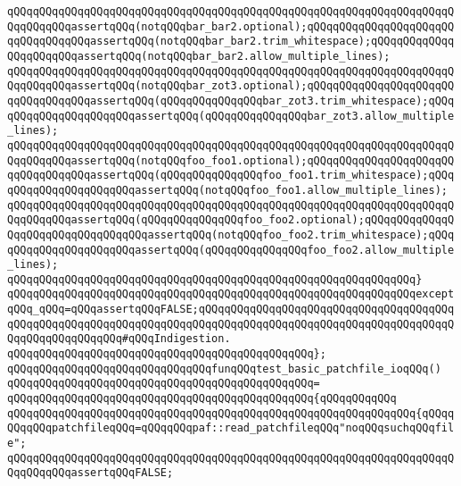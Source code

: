 \verb|qQQqqQQqqQQqqQQqqQQqqQQqqQQqqQQqqQQqqQQqqQQqqQQqqQQqqQQqqQQqqQQqqQQqqQQqqQQqqQQqassertqQQq(notqQQqbar_bar2.optional);qQQqqQQqqQQqqQQqqQQqqQQqqQQqqQQqqQQqassertqQQq(notqQQqbar_bar2.trim_whitespace);qQQqqQQqqQQqqQQqqQQqqQQqassertqQQq(notqQQqbar_bar2.allow_multiple_lines);|\newline
\verb|qQQqqQQqqQQqqQQqqQQqqQQqqQQqqQQqqQQqqQQqqQQqqQQqqQQqqQQqqQQqqQQqqQQqqQQqqQQqqQQqassertqQQq(notqQQqbar_zot3.optional);qQQqqQQqqQQqqQQqqQQqqQQqqQQqqQQqqQQqassertqQQq(qQQqqQQqqQQqqQQqbar_zot3.trim_whitespace);qQQqqQQqqQQqqQQqqQQqqQQqassertqQQq(qQQqqQQqqQQqqQQqbar_zot3.allow_multiple_lines);|\newline
\newline
\verb|qQQqqQQqqQQqqQQqqQQqqQQqqQQqqQQqqQQqqQQqqQQqqQQqqQQqqQQqqQQqqQQqqQQqqQQqqQQqqQQqassertqQQq(notqQQqfoo_foo1.optional);qQQqqQQqqQQqqQQqqQQqqQQqqQQqqQQqqQQqassertqQQq(qQQqqQQqqQQqqQQqfoo_foo1.trim_whitespace);qQQqqQQqqQQqqQQqqQQqqQQqassertqQQq(notqQQqfoo_foo1.allow_multiple_lines);|\newline
\verb|qQQqqQQqqQQqqQQqqQQqqQQqqQQqqQQqqQQqqQQqqQQqqQQqqQQqqQQqqQQqqQQqqQQqqQQqqQQqqQQqassertqQQq(qQQqqQQqqQQqqQQqfoo_foo2.optional);qQQqqQQqqQQqqQQqqQQqqQQqqQQqqQQqqQQqassertqQQq(notqQQqfoo_foo2.trim_whitespace);qQQqqQQqqQQqqQQqqQQqqQQqassertqQQq(qQQqqQQqqQQqqQQqfoo_foo2.allow_multiple_lines);|\newline
\verb|qQQqqQQqqQQqqQQqqQQqqQQqqQQqqQQqqQQqqQQqqQQqqQQqqQQqqQQqqQQqqQQq}|\newline
\verb|qQQqqQQqqQQqqQQqqQQqqQQqqQQqqQQqqQQqqQQqqQQqqQQqqQQqqQQqqQQqqQQqexceptqQQq_qQQq=qQQqassertqQQqFALSE;qQQqqQQqqQQqqQQqqQQqqQQqqQQqqQQqqQQqqQQqqQQqqQQqqQQqqQQqqQQqqQQqqQQqqQQqqQQqqQQqqQQqqQQqqQQqqQQqqQQqqQQqqQQqqQQqqQQqqQQqqQQqqQQq#qQQqIndigestion.|\newline
\verb|qQQqqQQqqQQqqQQqqQQqqQQqqQQqqQQqqQQqqQQqqQQqqQQq};|\newline
\newline
\verb|qQQqqQQqqQQqqQQqqQQqqQQqqQQqqQQqfunqQQqtest_basic_patchfile_ioqQQq()|\newline
\verb|qQQqqQQqqQQqqQQqqQQqqQQqqQQqqQQqqQQqqQQqqQQqqQQq=|\newline
\verb|qQQqqQQqqQQqqQQqqQQqqQQqqQQqqQQqqQQqqQQqqQQqqQQq{qQQqqQQqqQQq|\newline
\verb|qQQqqQQqqQQqqQQqqQQqqQQqqQQqqQQqqQQqqQQqqQQqqQQqqQQqqQQqqQQqqQQq{qQQqqQQqqQQqpatchfileqQQq=qQQqqQQqpaf::read_patchfileqQQq"noqQQqsuchqQQqfile";|\newline
\verb|qQQqqQQqqQQqqQQqqQQqqQQqqQQqqQQqqQQqqQQqqQQqqQQqqQQqqQQqqQQqqQQqqQQqqQQqqQQqqQQqassertqQQqFALSE;|\newline
